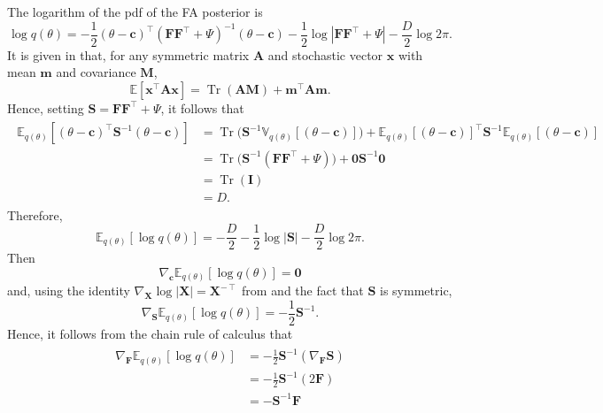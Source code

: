 \documentclass[msc,deptreport.inf]{infthesis} %
\newcommand{\matr}[1]{\mathbf{#1}}
\newcommand{\E}{\mathbb E}
\newcommand{\V}{\mathbb V}
\newcommand{\tr}{\mathop{\mathrm{Tr}}}
\begin{document}
The logarithm of the pdf of the FA posterior is
\begin{equation}
	\log q(\theta)
	= -\frac{1}{2} (\theta - \matr{c})^\intercal (\matr{FF}^{\intercal} + \Psi)^{-1} (\theta - \matr{c})  
	- \frac{1}{2} \log |\matr{FF}^{\intercal} + \Psi| 
	- \frac{D}{2} \log 2\pi.
\end{equation}
It is given in \cite{petersen2012} that, for any symmetric matrix $\matr{A}$ and stochastic vector $\matr{x}$ with mean $\matr{m}$ and covariance $\matr{M}$,
\begin{equation}\label{eqn:expectation_xTAx}
	\E [\matr{x}^\intercal \matr{A} \matr{x}] = \tr(\matr{A}\matr{M}) + \matr{m}^\intercal \matr{A} \matr{m}.
\end{equation}
Hence, setting $\matr{S} = \matr{FF}^{\intercal} + \Psi$, it follows that
\begin{align}
\begin{split}
	\E_{q(\theta)} [(\theta - \matr{c})^\intercal \matr{S}^{-1} (\theta - \matr{c}) ] 
	& = \tr\big(\matr{S}^{-1} \V_{q(\theta)}[(\theta - \matr{c})] \big) 
	+ \E_{q(\theta)}[(\theta - \matr{c})]^\intercal \matr{S}^{-1} \E_{q(\theta)}[(\theta - \matr{c})] \\
	& = \tr\big(\matr{S}^{-1} (\matr{FF}^{\intercal} + \Psi)\big)
	+ \matr{0} \matr{S}^{-1} \matr{0} \\
	& = \tr(\matr{I}) \\
	& = D.
\end{split}
\end{align}
Therefore,
\begin{equation}\label{eqn:expectation_of_vi_dist}
	\E_{q(\theta)}[\log q(\theta)]
	= -\frac{D}{2} - \frac{1}{2} \log |\matr{S}| - \frac{D}{2} \log 2\pi.
\end{equation}
Then 
\begin{equation}
	\nabla_\matr{c} \E_{q(\theta)} [\log q(\theta)] = \matr{0}
\end{equation}
and, using the identity $\nabla_\matr{X} \log |\matr{X}| = \matr{X}^{-\intercal}$ from \cite{petersen2012} and the fact that $\matr{S}$ is symmetric,
\begin{equation}
	\nabla_\matr{S} \E_{q(\theta)} [\log q(\theta)] = -\frac{1}{2} \matr{S}^{-1}.
\end{equation}
Hence, it follows from the chain rule of calculus that
\begin{align}
\begin{split}\label{eqn:grad_vi_dist_wrt_F}
	\nabla_\matr{F} \E_{q(\theta)} [\log q(\theta)]
	& = -\frac{1}{2} \matr{S}^{-1} (\nabla_\matr{F} \matr{S}) \\
	& = -\frac{1}{2} \matr{S}^{-1} (2\matr{F}) \\
	& = -\matr{S}^{-1}\matr{F}
\end{split}
\end{align}
\end{document}
